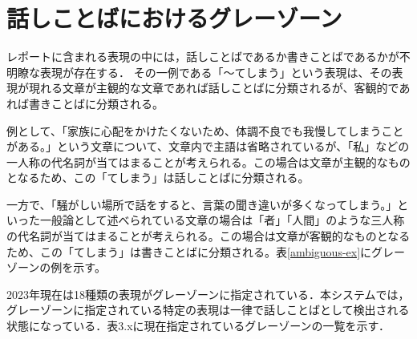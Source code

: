 \section{話しことばにおけるグレーゾーン}
レポートに含まれる表現の中には，話しことばであるか書きことばであるかが不明瞭な表現が存在する．
その一例である「～てしまう」という表現は、その表現が現れる文章が主観的な文章であれば話しことばに分類されるが、客観的であれば書きことばに分類される。

例として、「家族に心配をかけたくないため、体調不良でも我慢してしまうことがある。」という文章について、文章内で主語は省略されているが、「私」などの一人称の代名詞が当てはまることが考えられる。この場合は文章が主観的なものとなるため、この「てしまう」は話しことばに分類される。

一方で、「騒がしい場所で話をすると、言葉の聞き違いが多くなってしまう。」といった一般論として述べられている文章の場合は「者」「人間」のような三人称の代名詞が当てはまることが考えられる。この場合は文章が客観的なものとなるため、この「てしまう」は書きことばに分類される。表\ref{ambiguous-ex}にグレーゾーンの例を示す。



2023年現在は18種類の表現がグレーゾーンに指定されている．本システムでは，グレーゾーンに指定されている特定の表現は一律で話しことばとして検出される状態になっている．表3.xに現在指定されているグレーゾーンの一覧を示す．

